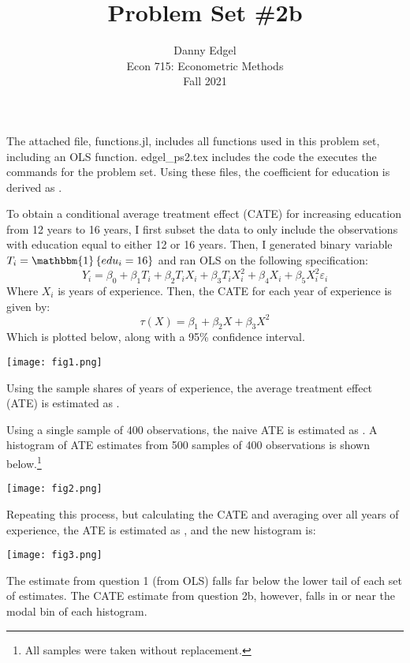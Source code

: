 \documentclass{article}
\newcommand{\one}[1]{\mathbbm{1}\left\{#1\right\}}
\newcommand{\eps}{\varepsilon}
\begin{document}
\title{	Problem Set \#2b }
\author{ 	Danny Edgel 					\\ 
			Econ 715: Econometric Methods	\\
			Fall 2021						
		}
\maketitle\thispagestyle{empty}


\noindent The attached file, functions.jl, includes all functions used in this problem set, including an OLS function. edgel\_ps2.tex includes the code the executes the commands for the problem set. Using these files, the coefficient for education is derived as .

To obtain a conditional average treatment effect (CATE) for increasing education from 12 years to 16 years, I first subset the data to only include the observations with education equal to either 12 or 16 years. Then, I generated binary variable ${T_i = \one{edu_i = 16}}$ and ran OLS on the following specification:\[
    Y_i = \beta_0 + \beta_1T_i + \beta_2T_iX_i + \beta_3T_iX_i^2 + \beta_4X_i + \beta_5X_i^2 \eps_i
\]
Where $X_i$ is years of experience. Then, the CATE for each year of experience is given by:\[
    \tau(X) = \beta_1 + \beta_2X + \beta_3X^2
\]
Which is plotted below, along with a 95\% confidence interval.
\begin{center}
    \texttt{[image: fig1.png]}
\end{center}
Using the sample shares of years of experience, the average treatment effect (ATE) is estimated as . 

Using a single sample of 400 observations, the naive ATE is estimated as . A histogram of ATE estimates from 500 samples of 400 observations is shown below.\footnote{All samples were taken without replacement.}
\begin{center}
    \texttt{[image: fig2.png]}
\end{center}
Repeating this process, but calculating the CATE and averaging over all years of experience, the ATE is estimated as , and the new histogram is:
\begin{center}
    \texttt{[image: fig3.png]}
\end{center}
The estimate from question 1 (from OLS) falls far below the lower tail of each set of estimates. The CATE estimate from question 2b, however, falls in or near the modal bin of each histogram.
\end{document}
